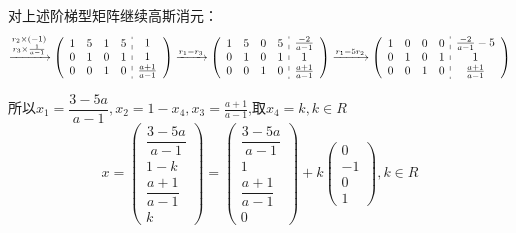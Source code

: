\documentclass[a4paper]{report}
\begin{document}
\begin{jie}
对上述阶梯型矩阵继续高斯消元：
\begin{align*}
\xrightarrow{\substack{r_{2}\times (-1)\\ r_3\times \frac{1}{a-1}}}
{
\left(
 \begin{array}{c:c}
\begin{matrix}
1 & 5 & 1 &5\\
0 & 1 & 0 &1 \\
0 & 0 & 1 &0
\end{matrix}&
\begin{matrix}
1  \\
1  \\
\frac{a+1}{a-1}
\end{matrix}
\end{array}
\right)
}\xrightarrow{\substack{r_{1}-r_3}}
{
\left(
 \begin{array}{c:c}
\begin{matrix}
1 & 5 & 0 &5\\
0 & 1 & 0 &1 \\
0 & 0 & 1 &0
\end{matrix}&
\begin{matrix}
\frac{-2}{a-1}  \\
1  \\
\frac{a+1}{a-1}
\end{matrix}
\end{array}
\right)
}\xrightarrow{\substack{r_{1}-5r_2}}
{
\left(
 \begin{array}{c:c}
\begin{matrix}
1 & 0 & 0 &0\\
0 & 1 & 0 &1 \\
0 & 0 & 1 &0
\end{matrix}&
\begin{matrix}
\frac{-2}{a-1}-5  \\
1  \\
\frac{a+1}{a-1}
\end{matrix}
\end{array}
\right)
}
\end{align*}

所以$x_1=\dfrac{3-5a}{a-1},x_2=1-x_4,x_{3}=\frac{a+1}{a-1}$,取$x_4=k,k\in R$
\begin{equation*}
x=
\begin{pmatrix}
\dfrac{3-5a}{a-1}\\[2pt]
1-k\\
\dfrac{a+1}{a-1}\\[2pt]
k
\end{pmatrix}=\begin{pmatrix}
\dfrac{3-5a}{a-1}\\[2pt]
1\\
\dfrac{a+1}{a-1}\\[2pt]
0
\end{pmatrix}+k
\begin{pmatrix}
0\\
-1\\
0\\
1
\end{pmatrix},k\in R
\end{equation*}


\end{jie}
\end{document}
